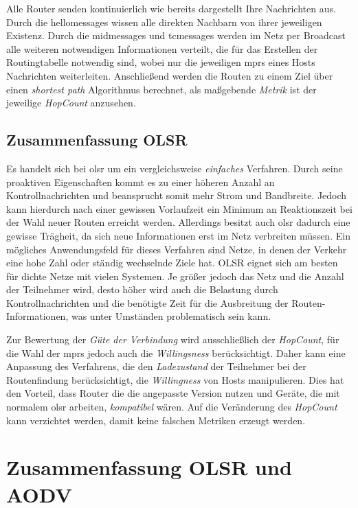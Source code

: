 Alle Router senden kontinuierlich wie bereits dargestellt Ihre Nachrichten aus. Durch die \glspl{hellomessage} wissen alle direkten Nachbarn von ihrer jeweiligen Existenz. Durch die \glspl{midmessage} und \glspl{tcmessage} werden im Netz per Broadcast alle weiteren notwendigen Informationen verteilt, die für das Erstellen der Routingtabelle notwendig sind, wobei nur die jeweiligen \glspl{mpr} eines Hosts Nachrichten weiterleiten. Anschließend werden die Routen zu einem Ziel über einen \textit{shortest path} Algorithmus berechnet, als maßgebende \textit{Metrik} ist der jeweilige \textit{HopCount} anzusehen.

\subsection{Zusammenfassung OLSR}
\label{chapter:routing:olsr:summary}

Es handelt sich bei \gls{olsr} um ein vergleichsweise \textit{einfaches} Verfahren. Durch seine proaktiven Eigenschaften kommt es zu einer höheren Anzahl an Kontrollnachrichten und beansprucht somit mehr Strom und Bandbreite. Jedoch kann hierdurch nach einer gewissen Vorlaufzeit ein Minimum an Reaktionszeit bei der Wahl neuer Routen erreicht werden. Allerdings besitzt auch \gls{olsr} dadurch eine gewisse Trägheit, da sich neue Informationen erst im Netz verbreiten müssen. Ein mögliches Anwendungsfeld für dieses Verfahren sind Netze, in denen der Verkehr eine hohe Zahl oder ständig wechselnde Ziele hat. OLSR eignet sich am besten für dichte Netze mit vielen Systemen. Je größer jedoch das Netz und die Anzahl der Teilnehmer wird, desto höher wird auch die Belastung durch Kontrollnachrichten und die benötigte Zeit für die Ausbreitung der Routen-Informationen, was unter Umständen problematisch sein kann.\newline

Zur Bewertung der \textit{Güte der Verbindung} wird ausschließlich der \textit{HopCount}, für die Wahl der \glspl{mpr} jedoch auch die \textit{Willingsness} berücksichtigt. Daher kann eine Anpassung des Verfahrens, die den \textit{Ladezustand} der Teilnehmer bei der Routenfindung berücksichtigt, die \textit{Willingness} von Hosts manipulieren. Dies hat den Vorteil, dass Router die die angepasste Version nutzen und Geräte, die mit normalem \gls{olsr} arbeiten, \textit{kompatibel} wären. Auf die Veränderung des \textit{HopCount} kann verzichtet werden, damit keine falschen Metriken erzeugt werden.

\section{Zusammenfassung OLSR und AODV}
\label{chapter:routing:verleich}

